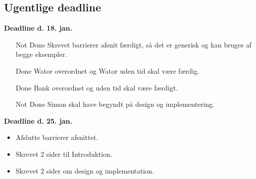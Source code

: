 \subsection*{Ugentlige deadline}
\textbf{Deadline d. 18. jan.}
\begin{itemize}{}{}\tightlist
\item [Not Done]Skrevet barrierer afsnit færdigt, så det er generisk og kan bruges af begge eksempler.
\item [Done]Wator overordnet og Wator uden tid skal være færdig.
\item [Done]Bank overordnet og uden tid skal være færdigt. 
\item [Not Done]Simon skal have begyndt på design og implementering.
\end{itemize}

\textbf{Deadline d. 25. jan.}
\begin{itemize}{}{}\tightlist
\item Afslutte barrierer afsnittet.
\item Skrevet 2 sider til Introduktion.
\item Skrevet 2 sider om design og implementation.
\end{itemize} 
